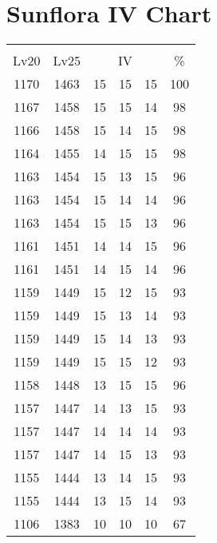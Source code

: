 \documentclass{article}%
\begin{document}
%
\normalsize%
\section{Sunflora IV Chart}%
\label{sec:Sunflora IV Chart}%
\renewcommand{\arraystretch}{1.5}%
\begin{tabular}{|c|c|c|c|c|c|}%
\hline%
\multicolumn{6}{|c|}{\textcolor{white}{ 
\linebreak{Sunflora}
}%
\cellcolor{black}}\\%
\multicolumn{1}{|c}{Lv20}&\multicolumn{1}{c|}{Lv25}&\multicolumn{3}{c|}{IV}&\multicolumn{1}{|c|}{\%}\\%
\hline%
\rowcolor{color100}%
1170&1463&15&15&15&100\\%
\hline%
\rowcolor{color98}%
1167&1458&15&15&14&98\\%
\hline%
\rowcolor{color98}%
1166&1458&15&14&15&98\\%
\hline%
\rowcolor{color98}%
1164&1455&14&15&15&98\\%
\hline%
\rowcolor{color96}%
1163&1454&15&13&15&96\\%
\hline%
\rowcolor{color96}%
1163&1454&15&14&14&96\\%
\hline%
\rowcolor{color96}%
1163&1454&15&15&13&96\\%
\hline%
\rowcolor{color96}%
1161&1451&14&14&15&96\\%
\hline%
\rowcolor{color96}%
1161&1451&14&15&14&96\\%
\hline%
\rowcolor{color93}%
1159&1449&15&12&15&93\\%
\hline%
\rowcolor{color93}%
1159&1449&15&13&14&93\\%
\hline%
\rowcolor{color93}%
1159&1449&15&14&13&93\\%
\hline%
\rowcolor{color93}%
1159&1449&15&15&12&93\\%
\hline%
\rowcolor{color96}%
1158&1448&13&15&15&96\\%
\hline%
\rowcolor{color93}%
1157&1447&14&13&15&93\\%
\hline%
\rowcolor{color93}%
1157&1447&14&14&14&93\\%
\hline%
\rowcolor{color93}%
1157&1447&14&15&13&93\\%
\hline%
\rowcolor{color93}%
1155&1444&13&14&15&93\\%
\hline%
\rowcolor{color93}%
1155&1444&13&15&14&93\\%
\hline%
\rowcolor{color91}%
1106&1383&10&10&10&67\\%
\end{tabular}

%
\end{document}
